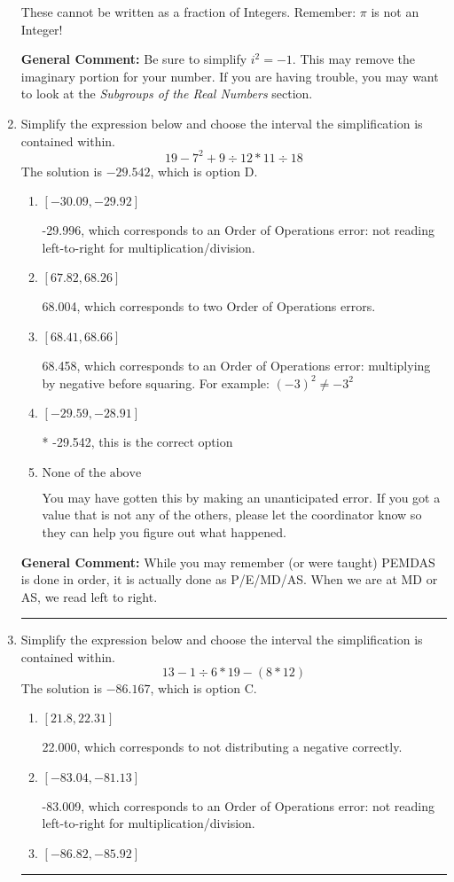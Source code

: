 \documentclass{extbook}[14pt]
\newcommand{\litem}[1]{\item #1

\rule{\textwidth}{0.4pt}}
\begin{document}
\begin{enumerate}
{\begin{enumerate}[label=\Alph*.]
These cannot be written as a fraction of Integers. Remember: $\pi$ is not an Integer!
\end{enumerate}

\textbf{General Comment:} Be sure to simplify $i^2 = -1$. This may remove the imaginary portion for your number. If you are having trouble, you may want to look at the \textit{Subgroups of the Real Numbers} section.
}
\litem{
Simplify the expression below and choose the interval the simplification is contained within.
\[ 19 - 7^2 + 9 \div 12 * 11 \div 18 \]The solution is \( -29.542 \), which is option D.\begin{enumerate}[label=\Alph*.]
\item \( [-30.09, -29.92] \)

 -29.996, which corresponds to an Order of Operations error: not reading left-to-right for multiplication/division.
\item \( [67.82, 68.26] \)

 68.004, which corresponds to two Order of Operations errors.
\item \( [68.41, 68.66] \)

 68.458, which corresponds to an Order of Operations error: multiplying by negative before squaring. For example: $(-3)^2 \neq -3^2$
\item \( [-29.59, -28.91] \)

* -29.542, this is the correct option
\item \( \text{None of the above} \)

 You may have gotten this by making an unanticipated error. If you got a value that is not any of the others, please let the coordinator know so they can help you figure out what happened.
\end{enumerate}

\textbf{General Comment:} While you may remember (or were taught) PEMDAS is done in order, it is actually done as P/E/MD/AS. When we are at MD or AS, we read left to right.
}
\litem{
Simplify the expression below and choose the interval the simplification is contained within.
\[ 13 - 1 \div 6 * 19 - (8 * 12) \]The solution is \( -86.167 \), which is option C.\begin{enumerate}[label=\Alph*.]
\item \( [21.8, 22.31] \)

 22.000, which corresponds to not distributing a negative correctly.
\item \( [-83.04, -81.13] \)

 -83.009, which corresponds to an Order of Operations error: not reading left-to-right for multiplication/division.
\item \( [-86.82, -85.92] \)


\end{enumerate}}
\end{enumerate}
\end{document}
